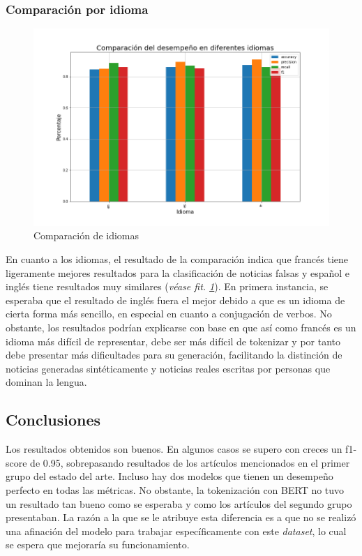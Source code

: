 \subsubsection{Comparación por idioma}
\begin{figure}
    \centering
    \includegraphics[width=\textwidth]{results/FakeNewsDetection/language_comparison.png}
    \caption{Comparación de idiomas}
    \label{fig:fake_news_languages}
\end{figure}

En cuanto a los idiomas, el resultado de la comparación indica que francés tiene ligeramente mejores resultados para la clasificación de noticias falsas y español e inglés tiene resultados muy similares (\textit{véase fit. \ref{fig:fake_news_languages}}). En primera instancia, se esperaba que el resultado de inglés fuera el mejor debido a que es un idioma de cierta forma más sencillo, en especial en cuanto a conjugación de verbos. No obstante, los resultados podrían explicarse con base en que así como francés es un idioma más difícil de representar, debe ser más difícil de tokenizar y por tanto debe presentar más dificultades para su generación, facilitando la distinción de noticias generadas sintéticamente y noticias reales escritas por personas que dominan la lengua.

\subsection{Conclusiones}
Los resultados obtenidos son buenos. En algunos casos se supero con creces un f1-score de 0.95, sobrepasando resultados de los artículos mencionados en el primer grupo del estado del arte. Incluso hay dos modelos que tienen un desempeño perfecto en todas las métricas. No obstante, la tokenización con BERT no tuvo un resultado tan bueno como se esperaba y como los artículos del segundo grupo presentaban. La razón a la que se le atribuye esta diferencia es a que no se realizó una afinación del modelo para trabajar específicamente con este \textit{dataset}, lo cual se espera que mejoraría su funcionamiento.\\

